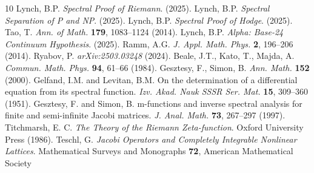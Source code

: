 \documentclass{article}
\begin{document}
\begin{thebibliography}{10}
 Lynch, B.P. \emph{Spectral Proof of Riemann}. (2025).
 Lynch, B.P. \emph{Spectral Separation of P and NP}. (2025).
 Lynch, B.P. \emph{Spectral Proof of Hodge}. (2025).
 Tao, T. \emph{Ann. of Math.} \textbf{179}, 1083--1124 (2014).
 Lynch, B.P. \emph{Alpha: Base-24 Continuum Hypothesis}. (2025).
 Ramm, A.G. \emph{J. Appl. Math. Phys.} \textbf{2}, 196--206 (2014).
 Ryabov, P. \emph{arXiv:2503.03248} (2024).
 Beale, J.T., Kato, T., Majda, A. \emph{Commun. Math. Phys.} \textbf{94}, 61--66 (1984).
 Gesztesy, F., Simon, B. \emph{Ann. Math.} \textbf{152} (2000).
 Gelfand, I.M. and Levitan, B.M. On the determination of a differential equation from its spectral function. \emph{Izv. Akad. Nauk SSSR Ser. Mat.} \textbf{15}, 309--360 (1951).
 Gesztesy, F. and Simon, B. m-functions and inverse spectral analysis for finite and semi-infinite Jacobi matrices. \emph{J. Anal. Math.} \textbf{73}, 267--297 (1997).
 Titchmarsh, E. C. \emph{The Theory of the Riemann Zeta-function}. Oxford University Press (1986).
 Teschl, G. \emph{Jacobi Operators and Completely Integrable Nonlinear Lattices}. Mathematical Surveys and Monographs \textbf{72}, American Mathematical Society
\end{thebibliography}
\end{document}
